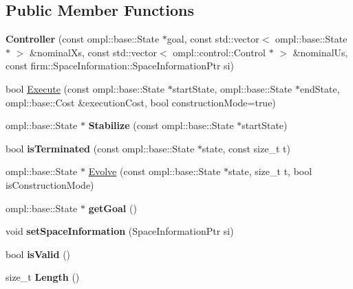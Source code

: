 \subsection*{\-Public \-Member \-Functions}
\begin{DoxyCompactItemize}
\item 
\hypertarget{class_controller_a50a65edd2cf9fcce0cca465cbc3d527d}{{\bfseries \-Controller} (const ompl\-::base\-::\-State $\ast$goal, const std\-::vector$<$ ompl\-::base\-::\-State $\ast$ $>$ \&nominal\-Xs, const std\-::vector$<$ ompl\-::control\-::\-Control $\ast$ $>$ \&nominal\-Us, const firm\-::\-Space\-Information\-::\-Space\-Information\-Ptr si)}\label{class_controller_a50a65edd2cf9fcce0cca465cbc3d527d}

\item 
bool \hyperlink{class_controller_a01cbbc1435d0a4ed8733332bef6d7342}{\-Execute} (const ompl\-::base\-::\-State $\ast$start\-State, ompl\-::base\-::\-State $\ast$end\-State, ompl\-::base\-::\-Cost \&execution\-Cost, bool construction\-Mode=true)
\item 
\hypertarget{class_controller_aba227cad46f73fab5fcf37b41cae71a9}{ompl\-::base\-::\-State $\ast$ {\bfseries \-Stabilize} (const ompl\-::base\-::\-State $\ast$start\-State)}\label{class_controller_aba227cad46f73fab5fcf37b41cae71a9}

\item 
\hypertarget{class_controller_ab80efffa3b03aa4d1d10c0bf82675201}{bool {\bfseries is\-Terminated} (const ompl\-::base\-::\-State $\ast$state, const size\-\_\-t t)}\label{class_controller_ab80efffa3b03aa4d1d10c0bf82675201}

\item 
ompl\-::base\-::\-State $\ast$ \hyperlink{class_controller_ad7c50856efc6fa7855c7cad4c9bb2352}{\-Evolve} (const ompl\-::base\-::\-State $\ast$state, size\-\_\-t t, bool is\-Construction\-Mode)
\item 
\hypertarget{class_controller_a848b1e5a3dc6d36c3ede121b7461d896}{ompl\-::base\-::\-State $\ast$ {\bfseries get\-Goal} ()}\label{class_controller_a848b1e5a3dc6d36c3ede121b7461d896}

\item 
\hypertarget{class_controller_ac0b9c339df7157c73d61b7064f88483c}{void {\bfseries set\-Space\-Information} (\-Space\-Information\-Ptr si)}\label{class_controller_ac0b9c339df7157c73d61b7064f88483c}

\item 
\hypertarget{class_controller_acd39b9995176be2ac40b286c0cdaeabd}{bool {\bfseries is\-Valid} ()}\label{class_controller_acd39b9995176be2ac40b286c0cdaeabd}

\item 
\hypertarget{class_controller_a2aa89a4cd76ba7fb6ad717d608b8c355}{size\-\_\-t {\bfseries \-Length} ()}\label{class_controller_a2aa89a4cd76ba7fb6ad717d608b8c355}

\end{DoxyCompactItemize}
